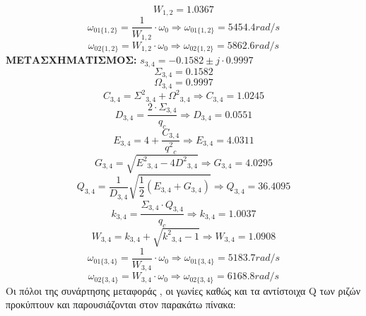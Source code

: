 \documentclass{article}
\begin{document}
{\begin{equation*}
\boxed{W_{1,2} = 1.0367}  
\end{equation*}
\begin{equation*}
ω_{01\{1,2\}} = \frac{1}{W_{1,2}}\cdot ω_0 \Rightarrow \boxed{ω_{01\{1,2\}} = 5454.4 rad/s}
\end{equation*}
\begin{equation*}
ω_{02\{1,2\}} = W_{1,2} \cdot ω_0  \Rightarrow \boxed{ω_{02\{1,2\}} = 5862.6 rad/s}  
\end{equation*}
\textbf{ΜΕΤΑΣΧΗΜΑΤΙΣΜΟΣ: } $s_{3,4} =  -0.1582 \pm j\cdot0.9997$\\
\begin{equation*}
{Σ}_{3,4} = 0.1582
\end{equation*}
\begin{equation*}
{Ω}_{3,4} = 0.9997
\end{equation*}
\begin{equation*}
{C}_{3,4} = {Σ^2}_{3,4} + {Ω^2}_{3,4} \Rightarrow \boxed{{C}_{3,4} = 1.0245}
\end{equation*}
\begin{equation*}
{D}_{3,4} = \frac{2 \cdot {Σ}_{3,4}}{q_c} \Rightarrow \boxed{{D}_{3,4} = 0.0551}
\end{equation*}
\begin{equation*}
{E}_{3,4} = 4 +\frac{{C}_{3,4}}{{q^2}_c} \Rightarrow \boxed{{E}_{3,4} = 4.0311}
\end{equation*}
\begin{equation*}
{G}_{3,4} = \sqrt{{E^2}_{3,4} - 4{D^2}_{3,4}} \Rightarrow \boxed{{G}_{3,4} = 4.0295}
\end{equation*}
\begin{equation*}
{Q}_{3,4} = \frac{1}{{D}_{3,4}} \sqrt{\frac{1}{2}({E}_{3,4}+{G}_{3,4})} \Rightarrow \boxed{{Q}_{3,4} = 36.4095}
\end{equation*}
\begin{equation*}
k_{3,4} = \frac{Σ_{3,4} \cdot Q_{3,4}}{q_c} \Rightarrow \boxed{k_{3,4} = 1.0037}
\end{equation*}
\begin{equation*}
W_{3,4} = k_{3,4} + \sqrt{{k^2}_{3,4}-1} \Rightarrow 
\boxed{W_{3,4} = 1.0908}  
\end{equation*}
\begin{equation*}
ω_{01\{3,4\}} = \frac{1}{W_{3,4}}\cdot ω_0 \Rightarrow \boxed{ω_{01\{3,4\}} = 5183.7 rad/s}
\end{equation*}
\begin{equation*}
ω_{02\{3,4\}} = W_{3,4} \cdot ω_0  \Rightarrow \boxed{ω_{02\{3,4\}} = 6168.8 rad/s}  
\end{equation*}
Οι πόλοι της συνάρτησης μεταφοράς , οι γωνίες καθώς και τα αντίστοιχα Q των ριζών προκύπτουν και παρουσιάζονται στον παρακάτω πίνακα:
\begin{center}


\end{center}}
\end{document}
